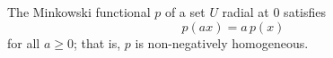 The Minkowski functional $p$ of a set $U$ radial at $0$ satisfies
$$
p(ax) = a\,p(x)
$$
for all $a \geq 0$; that is, $p$ is non-negatively homogeneous.
